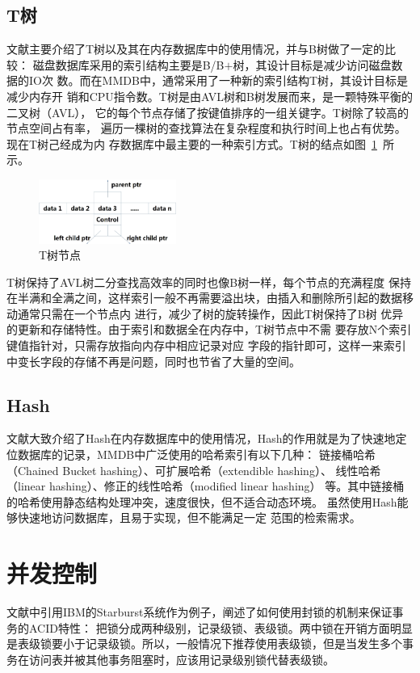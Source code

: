 \documentclass[literaturereview]{zjutreport}
\begin{document}
\subsection{T树}
文献\cite{ref:12}主要介绍了T树以及其在内存数据库中的使用情况，并与B树做了一定的比较：
磁盘数据库采用的索引结构主要是B/B$+$树，其设计目标是减少访问磁盘数据的IO次
数。而在MMDB中，通常采用了一种新的索引结构T树，其设计目标是减少内存开
销和CPU指令数。T树是由AVL树和B树发展而来，是一颗特殊平衡的二叉树（AVL），
它的每个节点存储了按键值排序的一组关键字。T树除了较高的节点空间占有率，
遍历一棵树的查找算法在复杂程度和执行时间上也占有优势。现在T树己经成为内
存数据库中最主要的一种索引方式。T树的结点如图~\ref{fig:treenode}~所示。

\begin{figure}[htbp]
\centering
\includegraphics[width=0.4\textwidth]{treenode}
\caption{T树节点}\label{fig:treenode}
\vspace{\baselineskip}
\end{figure}

T树保持了AVL树二分查找高效率的同时也像B树一样，每个节点的充满程度
保持在半满和全满之间，这样索引一般不再需要溢出块，由插入和删除所引起的数据移动通常只需在一个节点内
进行，减少了树的旋转操作，因此T树保持了B树
优异的更新和存储特性。由于索引和数据全在内存中，T树节点中不需
要存放N个索引键值指针对，只需存放指向内存中相应记录对应
字段的指针即可，这样一来索引中变长字段的存储不再是问题，同时也节省了大量的空间。

\subsection{Hash}
文献\cite{ref:13}大致介绍了Hash在内存数据库中的使用情况，Hash的作用就是为了快速地定位数据库的记录，MMDB中广泛使用的哈希索引有以下几种：
链接桶哈希（Chained Bucket hashing）、可扩展哈希\cite{ref:14}（extendible hashing）、
线性哈希（linear hashing）、修正的线性哈希（modified linear hashing）
等。其中链接桶的哈希使用静态结构处理冲突，速度很快，但不适合动态环境。
虽然使用Hash能够快速地访问数据库，且易于实现，但不能满足一定
范围的检索需求。

\section{并发控制}
文献\cite{ref:12}中引用IBM的Starburst系统作为例子，阐述了如何使用封锁的机制来保证事务的ACID特性：
把锁分成两种级别，记录级锁、表级锁。两中锁在开销方面明显是表级锁要小于记录级锁。所以，一般情况下推荐使用表级锁，但是当发生多个事务在访问表并被其他事务阻塞时，应该用记录级别锁代替表级锁。
\end{document}
